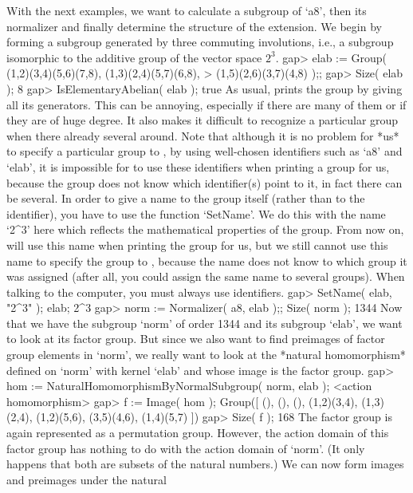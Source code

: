 With the next  examples, we want  to calculate a  subgroup of `a8', then
its  normalizer and finally determine the  structure of the extension. We
begin by forming a subgroup   generated by three commuting   involutions,
i.e., a subgroup  isomorphic to the   additive group of the  vector space
$2^3$.
\beginexample
gap> elab := Group( (1,2)(3,4)(5,6)(7,8), (1,3)(2,4)(5,7)(6,8),
>                   (1,5)(2,6)(3,7)(4,8) );;
gap> Size( elab );
8
gap> IsElementaryAbelian( elab );
true
\endexample
As usual, {\GAP} prints the group by giving  all its generators. This can
be annoying, especially if there are many of them or  if they are of huge
degree. It also makes  it difficult to recognize  a particular group when
there already several  around. Note  that  although it is no  problem for
*us* to    specify a particular  group to   {\GAP}, by  using well-chosen
identifiers such as `a8'  and `elab', it is  impossible for {\GAP} to use
these identifiers when printing  a group for us,  because the group  does
not know which identifier(s) point  to it, in fact  there can be several.
In order to    give a name  to  the  group  itself (rather   than  to the
identifier), you have to use the function `SetName'.  We do this with the
name `2^3' here which reflects  the mathematical properties of the group.
From now on,  {\GAP} will use  this name when  printing the group for us,
but we still cannot use this name to specify the group to {\GAP}, because
the name does  not know to which group   it was assigned (after  all, you
could assign the   same  name to several  groups).  When  talking  to the
computer, you must always use identifiers.
\beginexample
gap> SetName( elab, "2^3" ); elab;
2^3
gap> norm := Normalizer( a8, elab );; Size( norm );
1344
\endexample
{}
Now that  we  have the subgroup `norm'   of order 1344   and its subgroup
`elab', we want to look  at its factor  group. But since  we also want to
find preimages of factor group elements in `norm', we really want to look
at the  *natural homomorphism* defined on  `norm' with  kernel `elab' and
whose image is the factor group.
\beginexample
gap> hom := NaturalHomomorphismByNormalSubgroup( norm, elab );
<action homomorphism>
gap> f := Image( hom );
Group([ (), (), (), (1,2)(3,4), (1,3)(2,4), (1,2)(5,6), (3,5)(4,6), 
  (1,4)(5,7) ])
gap> Size( f );
168
\endexample
The factor group  is again represented as  a  permutation group. However,
the action domain  of this factor  group has  nothing  to do with  the
action domain of `norm'. (It only happens that both are subsets of the
natural numbers.) We can now form  images and preimages under the natural
